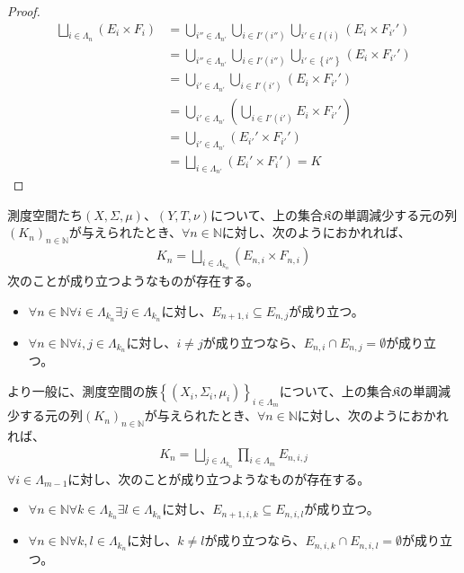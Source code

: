 \documentclass[dvipdfmx]{jsarticle}
\begin{document}
\begin{proof}
\begin{align*}
\bigsqcup_{i \in \varLambda_{n}} \left( E_{i} \times F_{i} \right) &= \bigcup_{i'' \in \varLambda_{n'}} {\bigcup_{i \in I'\left( i'' \right)} {\bigcup_{i' \in I(i)} \left( E_{i} \times F_{i'}' \right)}}\\
&= \bigcup_{i'' \in \varLambda_{n'}} {\bigcup_{i \in I'\left( i'' \right)} {\bigcup_{i' \in \left\{ i'' \right\}} \left( E_{i} \times F_{i'}' \right)}}\\
&= \bigcup_{i' \in \varLambda_{n'}} {\bigcup_{i \in I'\left( i' \right)} \left( E_{i} \times F_{i'}' \right)}\\
&= \bigcup_{i' \in \varLambda_{n'}} \left( \bigcup_{i \in I'\left( i' \right)} E_{i} \times F_{i'}' \right)\\
&= \bigcup_{i' \in \varLambda_{n'}} \left( E_{i'}' \times F_{i'}' \right)\\
&= \bigsqcup_{i \in \varLambda_{n'}} \left( E_{i}' \times F_{i}' \right) = K
\end{align*}
\end{proof}
\begin{thm}\label{4.5.7.4}
測度空間たち$(X,\varSigma,\mu)$、$(Y,T,\nu)$について、上の集合$\mathfrak{K}$の単調減少する元の列$\left( K_{n} \right)_{n \in \mathbb{N}}$が与えられたとき、$\forall n \in \mathbb{N}$に対し、次のようにおかれれば、
\begin{align*}
K_{n} = \bigsqcup_{i \in \varLambda_{k_{n}}} \left( E_{n,i} \times F_{n,i} \right)
\end{align*}
次のことが成り立つようなものが存在する。
\begin{itemize}
\item
  $\forall n \in \mathbb{N}\forall i \in \varLambda_{k_{n}}\exists j \in \varLambda_{k_{n}}$に対し、$E_{n + 1,i} \subseteq E_{n,j}$が成り立つ。
\item
  $\forall n \in \mathbb{N}\forall i,j \in \varLambda_{k_{n}}$に対し、$i \neq j$が成り立つなら、$E_{n,i} \cap E_{n,j} = \emptyset$が成り立つ。
\end{itemize}\par
より一般に、測度空間の族$\left\{ \left( X_{i},\varSigma_{i},\mu_{i} \right) \right\}_{i \in \varLambda_{m}}$について、上の集合$\mathfrak{K}$の単調減少する元の列$\left( K_{n} \right)_{n \in \mathbb{N}}$が与えられたとき、$\forall n \in \mathbb{N}$に対し、次のようにおかれれば、
\begin{align*}
K_{n} = \bigsqcup_{j \in \varLambda_{k_{n}}} {\prod_{i \in \varLambda_{m}} E_{n,i,j}}
\end{align*}
$\forall i \in \varLambda_{m - 1}$に対し、次のことが成り立つようなものが存在する。
\begin{itemize}
\item
  $\forall n \in \mathbb{N}\forall k \in \varLambda_{k_{n}}\exists l \in \varLambda_{k_{n}}$に対し、$E_{n + 1,i,k} \subseteq E_{n,i,l}$が成り立つ。
\item
  $\forall n \in \mathbb{N}\forall k,l \in \varLambda_{k_{n}}$に対し、$k \neq l$が成り立つなら、$E_{n,i,k} \cap E_{n,i,l} = \emptyset$が成り立つ。
\end{itemize}
\end{thm}
\end{document}
